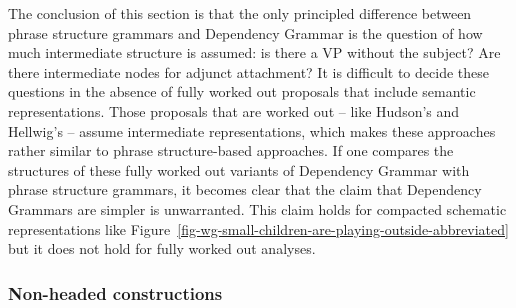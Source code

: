 The conclusion of this section is that the only principled difference between phrase structure grammars and
Dependency Grammar is the question of how much intermediate structure is assumed: is there a VP
without the subject? Are there intermediate nodes for adjunct attachment? It is difficult to decide
these questions in the absence of fully worked out proposals that include semantic
representations. Those proposals that are worked out -- like Hudson's and Hellwig's -- assume
intermediate representations, which makes these approaches rather similar to phrase structure-based
approaches. If one compares the structures of these fully worked out variants of Dependency Grammar
with phrase structure grammars, it becomes clear that the claim that Dependency Grammars are simpler
is unwarranted. This claim holds for compacted schematic representations like
Figure~\ref{fig-wg-small-children-are-playing-outside-abbreviated} but it does not hold for fully
worked out analyses.


\subsubsection{Non-headed constructions}
\label{sec-headless-constructions-dg}

